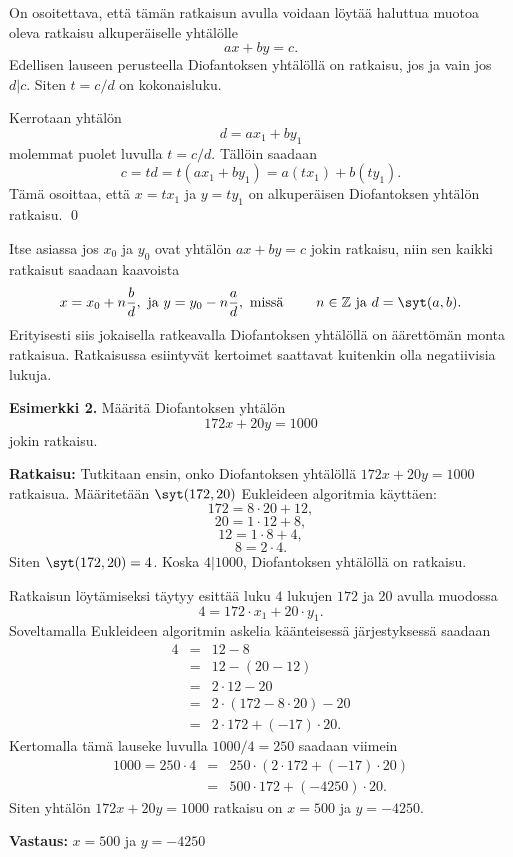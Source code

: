 On osoitettava, että tämän ratkaisun avulla voidaan löytää haluttua muotoa oleva ratkaisu alkuperäiselle yhtälölle
\[
a x + b y = c.
\]
Edellisen lauseen perusteella Diofantoksen yhtälöllä on ratkaisu, jos ja vain jos $d|c$. Siten $t=c/d$ on kokonaisluku.

Kerrotaan yhtälön
\[
d= a x_1 + b y_1
\]
molemmat puolet luvulla $t=c/d$. Tällöin saadaan
\[
c=td=t(a x_1 + b y_1) = a(tx_1)+ b(ty_1).
\]
Tämä osoittaa, että $x=tx_1$ ja $y=ty_1$ on alkuperäisen Diofantoksen yhtälön ratkaisu.
\qed

Itse asiassa jos $x_0$ ja $y_0$ ovat yhtälön $ax + by = c$ jokin ratkaisu, niin sen kaikki ratkaisut saadaan kaavoista
\[
x= x_0 + n\frac{b}{d}, \textrm{ ja } y=y_0 - n\frac{a}{d}, \textrm{ missä } \qquad n\in\mathbb{Z} \textrm{ ja } d=\syt(a,b).
\]
Erityisesti siis jokaisella ratkeavalla Diofantoksen yhtälöllä on äärettömän monta ratkaisua. Ratkaisussa esiintyvät kertoimet saattavat kuitenkin olla negatiivisia lukuja.

{\bf Esimerkki 2.} Määritä Diofantoksen yhtälön
\[
172x + 20y = 1000
\]
jokin ratkaisu.

{\bf Ratkaisu:} Tutkitaan ensin, onko Diofantoksen yhtälöllä $172x + 20y = 1000$ ratkaisua. Määritetään $\syt(172,20)$ Eukleideen algoritmia käyttäen:
\[
172 = 8 \cdot 20 +12,
\]
\[
20 = 1\cdot 12 + 8,
\]
\[
12 = 1 \cdot 8 +4,
\]
\[
8=2\cdot 4.
\]
Siten $\syt(172,20)=4$. Koska $4|1000$, Diofantoksen yhtälöllä on ratkaisu.

Ratkaisun löytämiseksi täytyy esittää luku $4$ lukujen $172$ ja $20$ avulla muodossa 
\[
4=172\cdot x_1 + 20 \cdot y_1.
\]
Soveltamalla Eukleideen algoritmin askelia käänteisessä järjestyksessä saadaan
\begin{eqnarray*}
4 &=& 12 - 8\\
  &=& 12-(20-12) \\
  &=& 2\cdot 12-20 \\
  &=& 2 \cdot (172-8\cdot 20)-20 \\
  &=& 2\cdot 172 +(-17) \cdot 20.
\end{eqnarray*}
Kertomalla tämä lauseke luvulla $1000/4=250$ saadaan viimein
\begin{eqnarray*}
1000 = 250\cdot 4 &=& 250 \cdot (2\cdot 172 +(-17) \cdot 20) \\
 &=& 500\cdot 172 + (-4250) \cdot 20.
\end{eqnarray*}
Siten yhtälön $172x + 20y = 1000$ ratkaisu on $x=500$ ja $y=-4250$.

{\bf Vastaus:} $x=500$ ja $y=-4250$


